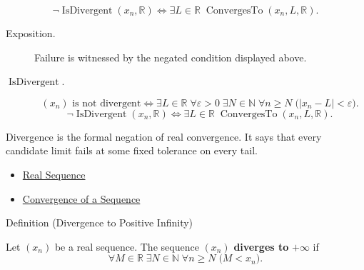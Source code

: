 \begin{remark*}
\[
\neg\operatorname{IsDivergent}(x_n,\mathbb{R})
\Longleftrightarrow
\exists L\in\mathbb{R}\;\operatorname{ConvergesTo}(x_n,L,\mathbb{R}).
\]
\end{remark*}
\begin{remark*}
\begin{description}
  \item[Exposition.]
Failure is witnessed by the negated condition displayed above.
  \item[\(\operatorname{IsDivergent}.\)]
\[
(x_n)\text{ is not divergent}
\Longleftrightarrow
\exists L\in\mathbb{R}\;\forall \varepsilon>0\;\exists N\in\mathbb{N}
\;\forall n\ge N\;\bigl(|x_n-L|<\varepsilon\bigr).
\]
\[
\neg\operatorname{IsDivergent}(x_n,\mathbb{R})
\Longleftrightarrow
\exists L\in\mathbb{R}\;\operatorname{ConvergesTo}(x_n,L,\mathbb{R}).
\]
\end{description}
\end{remark*}

\begin{remark*}[Interpretation]
Divergence is the formal negation of real convergence. It says that every
candidate limit fails at some fixed tolerance on every tail.
\end{remark*}

\begin{dependencies}
\begin{itemize}
  \item \hyperref[def:real-sequence]{Real Sequence}
  \item \hyperref[def:convergent-sequence]{Convergence of a Sequence}
\end{itemize}
\end{dependencies}


\begin{definitionbox}{Definition (Divergence to Positive Infinity)}
\begin{definition}
\label{def:diverges-to-positive-infinity}
Let $(x_n)$ be a real sequence. The sequence $(x_n)$ \textbf{diverges to}
$+\infty$ if
\[
  \forall M\in\mathbb{R}\;\exists N\in\mathbb{N}\;\forall n\ge N
  \;\bigl(M<x_n\bigr).
\]
\end{definition}
\end{definitionbox}

